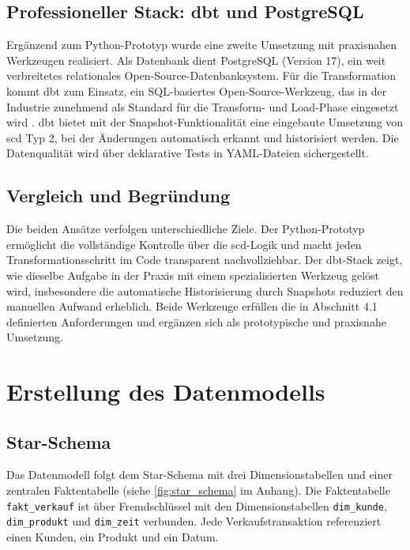 \documentclass[a4paper,11pt]{article}
\begin{document}
\subsection{Professioneller Stack: dbt und PostgreSQL}
Ergänzend zum Python-Prototyp wurde eine zweite Umsetzung mit praxisnahen Werkzeugen realisiert. Als Datenbank dient PostgreSQL 
(Version 17), ein weit verbreitetes relationales Open-Source-Datenbanksystem. Für die Transformation kommt \gls{dbt} zum Einsatz, 
ein SQL-basiertes Open-Source-Werkzeug, das in der Industrie zunehmend als Standard für die Transform- und Load-Phase eingesetzt wird \parencite[S.~2]{dorsey2025dbt}.
dbt bietet mit der Snapshot-Funktionalität eine eingebaute Umsetzung von \gls{scd} Typ 2, bei der Änderungen automatisch erkannt
und historisiert werden. Die Datenqualität wird über deklarative Tests in YAML-Dateien sichergestellt.

\subsection{Vergleich und Begründung}
Die beiden Ansätze verfolgen unterschiedliche Ziele. Der Python-Prototyp ermöglicht die vollständige Kontrolle über 
die \gls{scd}-Logik und macht jeden Transformationsschritt im Code transparent nachvollziehbar. Der dbt-Stack zeigt, 
wie dieselbe Aufgabe in der Praxis mit einem spezialisierten Werkzeug gelöst wird, insbesondere die automatische 
Historisierung durch Snapshots reduziert den manuellen Aufwand erheblich. Beide Werkzeuge erfüllen die in Abschnitt 
4.1 definierten Anforderungen und ergänzen sich als prototypische und praxisnahe Umsetzung.

\section{Erstellung des Datenmodells}

\subsection{Star-Schema}
Das Datenmodell folgt dem Star-Schema mit drei Dimensionstabellen und einer zentralen Faktentabelle 
(siehe \cref{fig:star_schema} im Anhang). Die Faktentabelle \texttt{fakt\_verkauf} ist über Fremdschlüssel
 mit den Dimensionstabellen \texttt{dim\_kunde}, \texttt{dim\_produkt} und \texttt{dim\_zeit} verbunden. 
 Jede Verkaufstransaktion referenziert einen Kunden, ein Produkt und ein Datum.
\end{document}
